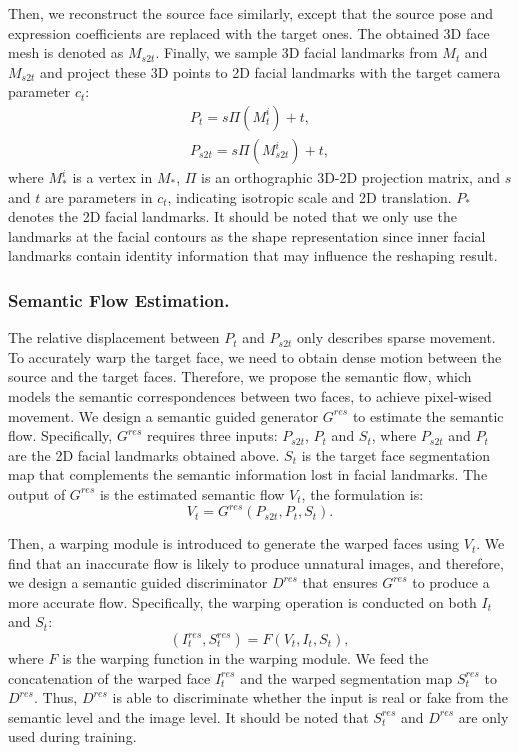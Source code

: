 Then, we reconstruct the source face similarly, except that the source pose and expression coefficients are replaced with the target ones. The obtained 3D face mesh is denoted as $M_{s2t}$. Finally, we sample 3D facial landmarks from $M_t$ and $M_{s2t}$ and project these 3D points to 2D facial landmarks with the target camera parameter $c_t$:
\begin{equation}
\begin{split}
    P_{t} =s \Pi\left(M_{t}^{i}\right)+t, \\
    P_{s2t} =s \Pi\left(M_{s2t}^{i}\right)+t,
\end{split}
\end{equation}
where $M_{*}^{i}$ is a vertex in $M_{*}$, $\Pi$ is an orthographic 3D-2D projection matrix, and $s$ and $t$ are parameters in $c_t$, indicating isotropic scale and 2D translation. $P_{*}$ denotes the 2D facial landmarks. It should be noted that we only use the landmarks at the facial contours as the shape representation since inner facial landmarks contain identity information that may influence the reshaping result. 

\subsubsection{Semantic Flow Estimation.}\label{para:se_flow_estimation}

The relative displacement between $P_t$ and $P_{s2t}$ only describes sparse movement.
To accurately warp the target face, we need to obtain dense motion between the source and the target faces.
Therefore, we propose the semantic flow, which models the semantic correspondences between two faces, to achieve pixel-wised movement. We design a semantic guided generator $G^{res}$ to estimate the semantic flow. Specifically, $G^{res}$ requires three inputs: $P_{s2t}$, $P_t$ and $S_t$, where $P_{s2t}$ and $P_t$ are the 2D facial landmarks obtained above.
$S_t$ is the target face segmentation map that complements the semantic information lost in facial landmarks. The output of $G^{res}$ is the estimated semantic flow $V_t$, the formulation is:
\begin{equation}
V_t = G^{res}(P_{s2t}, P_t, S_t).
\end{equation}

Then, a warping module is introduced to generate the warped faces using $V_t$. We find that an inaccurate flow is likely to produce unnatural images, and therefore, we design a semantic guided discriminator $D^{res}$ that ensures $G^{res}$ to produce a more accurate flow. Specifically, the warping operation is conducted on both $I_t$ and $S_t$:
\begin{equation}
(I_t^{res},S_t^{res}) = F(V_t, I_t, S_t),
\end{equation}
where $F$ is the warping function in the warping module. We feed the concatenation of the warped face $I_t^{res}$ and the warped segmentation map $S_t^{res}$ to $D^{res}$. Thus, $D^{res}$ is able to discriminate whether the input is real or fake from the semantic level and the image level. It should be noted that $S_t^{res}$ and $D^{res}$ are only used during training.

